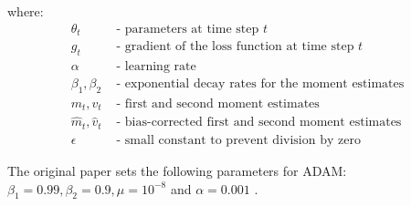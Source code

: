 where:
\begin{align*}
    \theta_t & \text{ - parameters at time step } t \\
    g_t & \text{ - gradient of the loss function at time step } t \\
    \alpha & \text{ - learning rate} \\
    \beta_1, \beta_2 & \text{ - exponential decay rates for the moment estimates} \\
    m_t, v_t & \text{ - first and second moment estimates} \\
    \hat{m}_t, \hat{v}_t & \text{ - bias-corrected first and second moment estimates} \\
    \epsilon & \text{ - small constant to prevent division by zero}
\end{align*}

The original paper sets the following parameters for ADAM: $\beta_1 = 0.99, \beta_2 = 0.9, \mu=10^{-8}$ and $\alpha = 0.001$ \cite{kingma2017adam}.